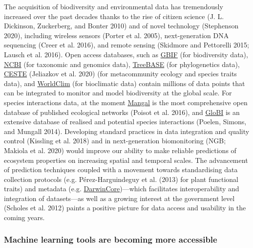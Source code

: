 \documentclass[10pt,oneside]{article}
\begin{document}
The acquisition of biodiversity and environmental data has tremendously
increased over the past decades thanks to the rise of citizen science
(J. L. Dickinson, Zuckerberg, and Bonter 2010) and of novel technology
(Stephenson 2020), including wireless sensors (Porter et al. 2005),
next-generation DNA sequencing (Creer et al. 2016), and remote sensing
(Skidmore and Pettorelli 2015; Lausch et al. 2016). Open access
databases, such as \href{https://www.gbif.org/}{GBIF} (for biodiversity
data), \href{https://www.ncbi.nlm.nih.gov/}{NCBI} (for taxonomic and
genomics data),
\href{https://www.treebase.org/treebase-web/home.html}{TreeBASE} (for
phylogenetics data), \href{https://icestes.github.io/}{CESTE} (Jeliazkov
et al. 2020) (for metacommunity ecology and species traits data), and
\href{https://www.worldclim.org/data/bioclim.html}{WorldClim} (for
bioclimatic data) contain millions of data points that can be integrated
to monitor and model biodiversity at the global scale. For species
interactions data, at the moment \href{https://mangal.io/\#/}{Mangal} is
the most comprehensive open database of published ecological networks
(Poisot et al. 2016), and
\href{https://www.globalbioticinteractions.org/about}{GloBI} is an
extensive database of realised and potential species interactions
(Poelen, Simons, and Mungall 2014). Developing standard practices in
data integration and quality control (Kissling et al. 2018) and in
next-generation biomonitoring (NGB; Makiola et al. 2020) would improve
our ability to make reliable predictions of ecosystem properties on
increasing spatial and temporal scales. The advancement of prediction
techniques coupled with a movement towards standardising data collection
protocols (e.g. Pérez-Harguindeguy et al. (2013) for plant functional
traits) and metadata (e.g.
\href{https://www.tdwg.org}{DarwinCore})---which facilitates
interoperability and integration of datasets---as well as a growing
interest at the government level (Scholes et al. 2012) paints a positive
picture for data access and usability in the coming years.

\hypertarget{machine-learning-tools-are-becoming-more-accessible}{%
\subsubsection{Machine learning tools are becoming more
accessible}\label{machine-learning-tools-are-becoming-more-accessible}}
\end{document}
